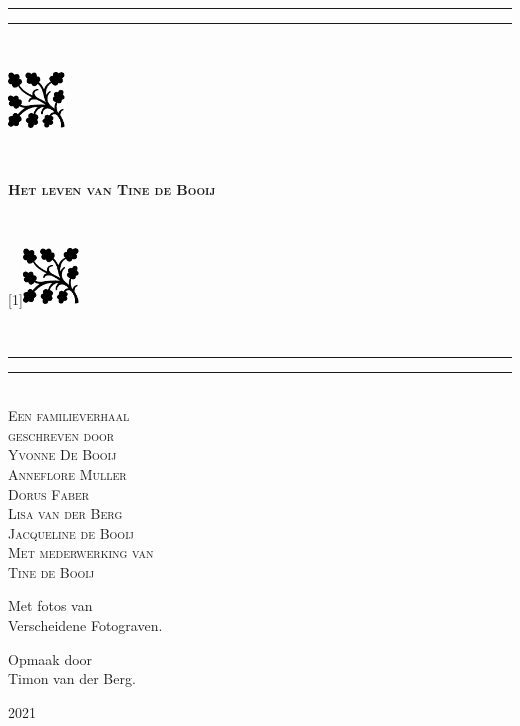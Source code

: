 {\begingroup
\centering 
\vfill
\parbox{\textwidth}{%
\rule{\textwidth}{1.6pt}\vspace*{-\baselineskip}\vspace*{2pt} %
\rule{\textwidth}{0.4pt}\\[0.2\baselineskip] %
\parbox{\textwidth}{%
\parbox[c][1.5cm][c]{1.5cm}{\includegraphics[height=1.5cm]{tikz/19}}
~ \hrulefill ~
\parbox[c][2cm][c]{7cm}{\centering\textsc{\Large \textbf{Het leven van Tine de Booij}}}
 ~\hrulefill ~
\parbox[c][1.5cm][c]{1.5cm}{\scalebox{-1}[1]{\includegraphics[height=1.5cm]{tikz/19}}}}\\[0.2\baselineskip] %
\rule{\textwidth}{0.4pt}\vspace*{-\baselineskip}\vspace{3.2pt} %
\rule{\textwidth}{1.6pt}}\\[\baselineskip] %
\scshape %
Een familieverhaal \\[0.2\baselineskip] %

\vspace*{2\baselineskip} %
geschreven door \\[0.5\baselineskip]
{\Large Yvonne De Booij } \\
{\Large Anneflore Muller} \\
{\Large Dorus Faber} \\
{\Large Lisa van der Berg} \\
{\Large Jacqueline de Booij} \\

\vfill
{Met mederwerking van  \\ {Tine de Booij}} 
\vfill \vfill
{Met fotos van  \\ {Verscheidene Fotograven.}\par} 
\vspace{10pt}
{Opmaak door  \\ {Timon van der Berg.}\par} 

\vfill %

{\scshape 2021} \\[0.3\baselineskip]

\endgroup}